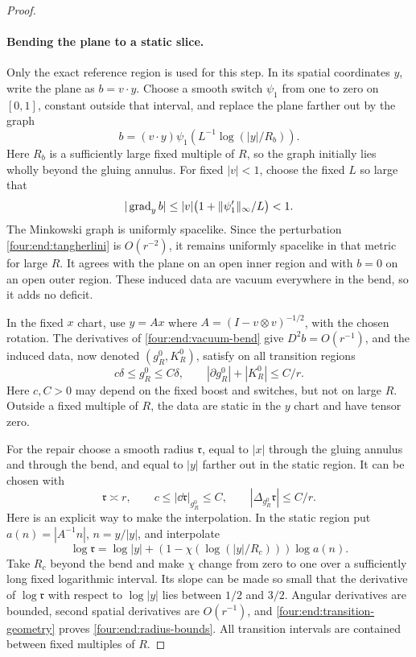 \begin{proof}
\paragraph{Bending the plane to a static slice.}
Only the exact reference region is used for this step. In its spatial
coordinates \(y\), write the plane as \(b=v\cdot y\). Choose a smooth
switch \(\psi_1\) from one to zero on \([0,1]\), constant outside that
interval, and replace the plane farther out by the graph
\begin{equation}\label{four:end:vacuum-bend}
 b=(v\cdot y)\psi_1\left(L^{-1}\log(|y|/R_b)\right).
\end{equation}
Here \(R_b\) is a sufficiently large fixed multiple of \(R\), so the
graph initially lies wholly beyond the gluing annulus. For fixed
\(|v|<1\), choose the fixed \(L\) so large that
\[
 |\operatorname{grad}_y b|
 \le |v|\bigl(1+\|\psi_1'\|_\infty/L\bigr)<1.
\]
The Minkowski graph is uniformly spacelike. Since the perturbation
\eqref{four:end:tangherlini} is \(O(r^{-2})\), it remains uniformly spacelike
in that metric for large \(R\). It agrees with the plane on an open
inner region and with \(b=0\) on an open outer region. These induced
data are vacuum everywhere in the bend, so it adds no deficit.

In the fixed \(x\) chart, use \(y=Ax\) where
\(A=(I-v\otimes v)^{-1/2}\), with the chosen rotation. The derivatives
of \eqref{four:end:vacuum-bend} give \(D^2b=O(r^{-1})\), and the induced
data, now denoted \((g_R^0,K_R^0)\), satisfy on all transition regions
\begin{equation}\label{four:end:transition-geometry}
 c\delta\le g_R^0\le C\delta,\qquad
 |\partial g_R^0|+|K_R^0|\le C/r.
\end{equation}
Here \(c,C>0\) may depend on the fixed boost and switches, but not
on large \(R\). Outside a fixed multiple of \(R\), the data are static
in the \(y\) chart and have tensor zero.

For the repair choose a smooth radius \(\mathfrak r\), equal to
\(|x|\) through the gluing annulus and through the bend, and equal to
\(|y|\) farther out in the static region. It can be chosen with
\begin{equation}\label{four:end:radius-bounds}
 \mathfrak r\asymp r,\qquad
 c\le|\dd\mathfrak r|_{g_R^0}\le C,
 \qquad |\Delta_{g_R^0}\mathfrak r|\le C/r.
\end{equation}
Here is an explicit way to make the interpolation. In the static region
put \(a(n)=|A^{-1}n|\), \(n=y/|y|\), and interpolate
\[
 \log\mathfrak r=\log|y|+(1-\chi(\log(|y|/R_c)))\log a(n).
\]
Take \(R_c\) beyond the bend and make \(\chi\) change from zero to one
over a sufficiently long fixed logarithmic interval. Its slope can be
made so small that the derivative of \(\log\mathfrak r\) with respect
to \(\log|y|\) lies between \(1/2\) and \(3/2\). Angular derivatives
are bounded, second spatial derivatives are \(O(r^{-1})\), and
\eqref{four:end:transition-geometry} proves \eqref{four:end:radius-bounds}.
All transition intervals are contained between fixed multiples of \(R\).


\end{proof}
